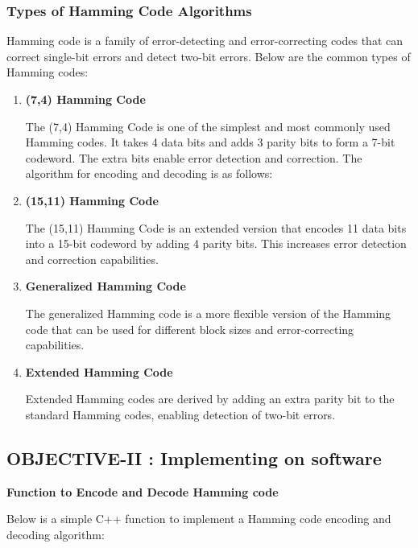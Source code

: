 \documentclass{article}
\numberwithin{equation}{section}
\numberwithin{figure}{section}
\numberwithin{table}{section}
\begin{document}
\subsubsection{Types of Hamming Code Algorithms}

Hamming code is a family of error-detecting and error-correcting codes that can correct single-bit errors and detect two-bit errors. Below are the common types of Hamming codes:

\begin{enumerate}

\item \textbf{(7,4) Hamming Code}

The (7,4) Hamming Code is one of the simplest and most commonly used Hamming codes. It takes 4 data bits and adds 3 parity bits to form a 7-bit codeword. The extra bits enable error detection and correction. The algorithm for encoding and decoding is as follows:

\item \textbf{(15,11) Hamming Code}

The (15,11) Hamming Code is an extended version that encodes 11 data bits into a 15-bit codeword by adding 4 parity bits. This increases error detection and correction capabilities.
\item \textbf{Generalized Hamming Code}

The generalized Hamming code is a more flexible version of the Hamming code that can be used for different block sizes and error-correcting capabilities.
\item \textbf{Extended Hamming Code}

Extended Hamming codes are derived by adding an extra parity bit to the standard Hamming codes, enabling detection of two-bit errors. 
\end{enumerate}

\pagebreak
\subsection{OBJECTIVE-II : Implementing on software}

\textbf{Function to Encode and Decode Hamming code}

Below is a simple C++ function to implement a Hamming code encoding and decoding algorithm:\cite{beneater2018}
\end{document}

